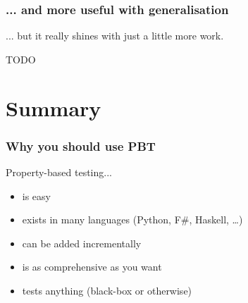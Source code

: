\documentclass{beamer}
\begin{document}
\begin{frame}[fragile]
\frametitle{... and more useful with generalisation}
... but it really shines with just a little more work.

\begin{fslisting}
    TODO 
\end{fslisting}
\end{frame}

\section*{Summary}
\begin{frame}
\frametitle{Why you should use PBT}
Property-based testing...
\begin{itemize}
\item is easy
\item exists in many languages (Python, F\#, Haskell, \dots)
\item can be added incrementally
\item is as comprehensive as you want
\item tests anything (black-box or otherwise)
\end{itemize}
\end{frame}
\end{document}
